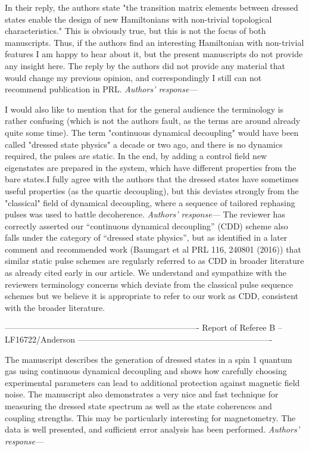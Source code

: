 \documentclass[letterpaper]{article}
\newenvironment{refcomment}{\singlespacing\verbatim}{\endverbatim}
\newcommand{\response}{\emph{Authors' response---}}
\begin{document}
\begin{refcomment}
In their reply, the authors state "the transition matrix
elements between dressed states enable the design of
new Hamiltonians with non-trivial topological 
characteristics." This is obviously true, but this is not the focus
of both manuscripts. Thus, if the authors find an interesting
Hamiltonian with non-trivial features I am happy to hear about it, but
the present manuscripts do not provide any insight here. The reply by
the authors did not provide any material that would change my previous
opinion, and correspondingly I still can not recommend publication in
PRL.
\end{refcomment}
\response


\begin{refcomment}
I would also like to mention that for the general audience the
terminology is rather confusing (which is not the authors fault, as
the terms are around already quite some time). The term "continuous
dynamical decoupling" would have been called "dressed state physics" a
decade or two ago, and there is no dynamics required, the pulses are
static. In the end, by adding a control field new eigenstates are
prepared in the system, which have different properties from the bare
states.I fully agree with the authors that the dressed states have
sometimes useful properties (as the quartic decoupling), but this
deviates strongly from the "classical" field of dynamical decoupling,
where a sequence of tailored rephasing pulses was used to battle
decoherence.
\end{refcomment}
\response 
The reviewer has correctly asserted our ``continuous dynamical decoupling'' (CDD) scheme also falls under the category of ``dressed state physics'', but as identified in a later comment and recommended work (Baumgart et al PRL 116, 240801 (2016)) that similar static pulse schemes are regularly referred to as CDD in broader literature as already cited early in our article.
We understand and sympathize with the reviewers terminology concerns which deviate from the classical pulse sequence schemes but we believe it is appropriate to refer to our work as CDD, consistent with the broader literature.


\newpage
\begin{refcomment}
----------------------------------------------------------------------
Report of Referee B -- LF16722/Anderson
----------------------------------------------------------------------

The manuscript describes the generation of dressed states in a spin 1 
quantum gas using continuous dynamical decoupling and shows how 
carefully choosing experimental parameters can lead to
additional protection against magnetic field noise. The manuscript 
also demonstrates a very nice and fast technique for measuring the 
dressed state spectrum as well as the state coherences and coupling 
strengths. This may be particularly interesting for magnetometry. The 
data is well presented, and sufficient error analysis has been 
performed.
\end{refcomment}
\response 
\end{document}
